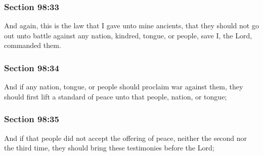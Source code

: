 	\subsubsection{Section 98:33} %
		\label{DC98-33}

		And again, this is the law that I gave unto mine ancients, that they should not go out unto battle against any nation, kindred, tongue, or people, save I, the Lord, commanded them.


	\subsubsection{Section 98:34} %
		\label{DC98-34}

		And if any nation, tongue, or people should proclaim war against them, they should first lift a standard of peace unto that people, nation, or tongue;


	\subsubsection{Section 98:35} %
		\label{DC98-35}

		And if that people did not accept the offering of peace, neither the second nor the third time, they should bring these testimonies before the Lord;


